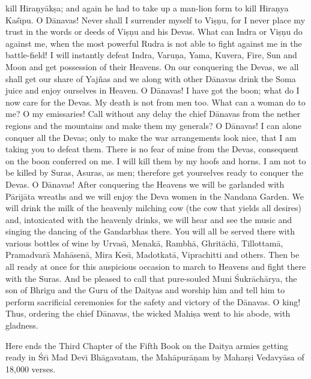 kill Hira\d{n}y\=ak\d{s}a; and again he had to take up a man-lion form to kill Hira\d{n}ya Ka\'s\={\i}pu. O D\=anavas! Never shall I surrender myself to Vi\d{s}\d{n}u, for I never place my trust in the words or deeds of Vi\d{s}\d{n}u and his Devas. What can Indra or Vi\d{s}\d{n}u do against me, when the most powerful Rudra is not able to fight against me in the battle-field! I will instantly defeat Indra, Varu\d{n}a, Yama, Kuvera, Fire, Sun and Moon and get possession of their Heavens. On our conquering the Devas, we all shall get our share of Yaj\~nas and we along with other D\=anavas drink the Soma juice and enjoy ourselves in Heaven. O D\=anavas! I have got the boon; what do I now care for the Devas. My death is not from men too. What can a woman do to me? O my emissaries! Call without any delay the chief D\=anavas from the nether regions and the mountains and make them my generals? O D\=anavas! I can alone conquer all the Devas; only to make the war arrangements look nice, that I am taking you to defeat them. There is no fear of mine from the Devas, consequent on the boon conferred on me. I will kill them by my hoofs and horns. I am not to be killed by Suras, Asuras, as men; therefore get yourselves ready to conquer the Devas. O D\=anavas! After conquering the Heavens we will be garlanded with P\=arij\=ata wreaths and we will enjoy the Deva women in the Nandana Garden. We will drink the milk of the heavenly milching cow (the cow that yields all desires) and, intoxicated with the heavenly drinks, we will hear and see the music and singing the dancing of the Gandarbhas there. You will all be served there with various bottles of wine by Urvas\={\i}, Menak\=a, Rambh\=a, Ghrit\=ach\={\i}, Tillottam\=a, Pramadvar\=a Mah\=asen\=a, Mira Kes\={\i}, Madotkat\=a, Viprachitti and others. Then be all ready at once for this auspicious occasion to march to Heavens and fight there with the Suras. And be pleased to call that pure-souled Muni \'Sukr\=ach\=arya, the son of Bhrigu and the Guru of the Daityas and worship him and tell him to perform sacrificial ceremonies for the safety and victory of the D\=anavas. O king! Thus, ordering the chief D\=anavas, the wicked Mahi\d{s}a went to his abode, with gladness.

Here ends the Third Chapter of the Fifth Book on the Daitya armies getting ready in \'Sr\={\i} Mad Dev\={\i} Bh\=agavatam, the Mah\=apur\=a\d{n}am by Mahar\d{s}i Vedavy\=asa of 18,000 verses.




